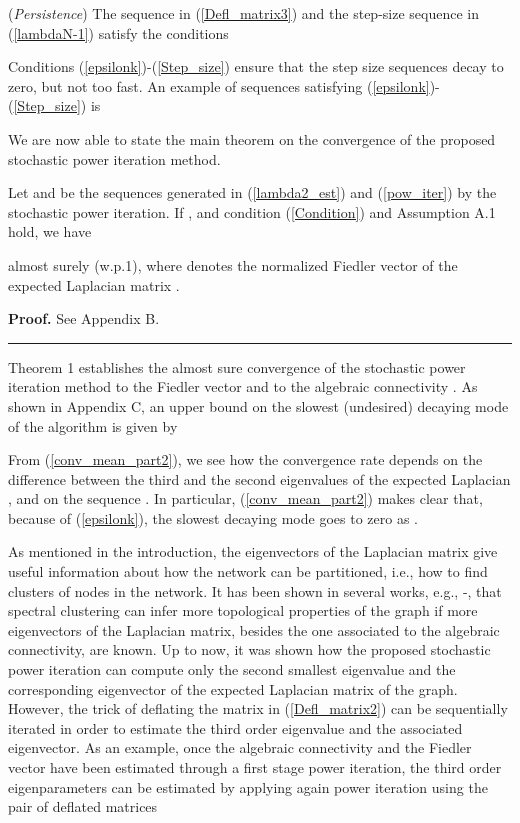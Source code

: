 \documentclass[10pt,twocolumn]{IEEEtran}
\newenvironment{proof}[1][Proof]{\noindent \textbf{#1.} }{\qedsymbol}
\newcommand{\qedsymbol}{\hspace{\fill}\rule{1.5ex}{1.5ex}}
\begin{document}
 (\emph{Persistence}) The sequence  in (\ref{Defl_matrix3}) and the step-size sequence  in (\ref{lambdaN-1}) satisfy the conditions

Conditions (\ref{epsilonk})-(\ref{Step_size})  ensure that the step size sequences decay to zero, but not too fast. An example of sequences satisfying (\ref{epsilonk})-(\ref{Step_size}) is



\noindent We are now able to state the main theorem on the convergence of the proposed stochastic power iteration method.

 Let  and  be the sequences generated in (\ref{lambda2_est}) and (\ref{pow_iter}) by the stochastic power iteration. If , and condition (\ref{Condition}) and Assumption A.1 hold, we have

almost surely (w.p.1), where  denotes the normalized Fiedler vector of the expected Laplacian matrix .

\begin{proof}
See Appendix B.
\end{proof}


Theorem 1 establishes the almost sure convergence of the stochastic power iteration method to the Fiedler vector  and to the algebraic connectivity . As shown in Appendix C, an upper bound on the slowest (undesired) decaying mode  of the algorithm is given by

From (\ref{conv_mean_part2}), we see how the convergence rate depends on the difference between the third and the second eigenvalues of the expected Laplacian , and on the sequence . In particular, (\ref{conv_mean_part2}) makes clear that, because of (\ref{epsilonk}), the slowest decaying mode goes to zero as .

 As mentioned in the introduction, the eigenvectors of the Laplacian matrix give useful information about how the network can be partitioned, i.e., how to find clusters of nodes in the network. It has been shown in several works, e.g., \cite{Bojan}-\cite{Hagen-Kaghn}, that spectral clustering can infer more topological properties of the graph if more eigenvectors of the Laplacian matrix, besides the one associated to the algebraic connectivity, are known. Up to now, it was shown how the proposed stochastic power iteration can compute only the second smallest eigenvalue and the corresponding eigenvector of the expected Laplacian matrix of the graph. However, the trick of deflating the matrix  in (\ref{Defl_matrix2}) can be sequentially iterated in order to estimate the third order eigenvalue and the associated eigenvector.
As an example, once the algebraic connectivity  and the Fiedler vector  have been estimated through a first stage power iteration, the third order eigenparameters can be estimated by applying again power iteration using the pair of deflated matrices
\end{document}
